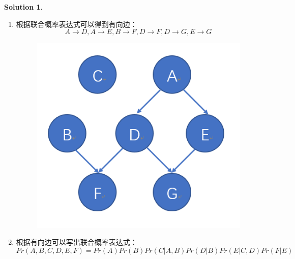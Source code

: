 \documentclass[a4paper,UTF8]{article}
\theoremstyle{definition}
\newtheorem*{solution}{Solution}
\begin{document}
\begin{solution}
	~\\
	\begin{enumerate}[(1)]
		\item 
		根据联合概率表达式可以得到有向边：
		\[
		A \rightarrow D,A \rightarrow E,B \rightarrow F,D \rightarrow F,D \rightarrow G,E \rightarrow G
		\]
		\begin{figure}[h]
			\centering
			\includegraphics[scale=0.3]{mybayes.png}
		\end{figure}
	
		\item 
		根据有向边可以写出联合概率表达式：
		\[
		Pr(A,B,C,D,E,F)=Pr(A)Pr(B)Pr(C|A,B)Pr(D|B)Pr(E|C,D)Pr(F|E)
		\]
		

\end{enumerate}
\end{solution}
\end{document}
